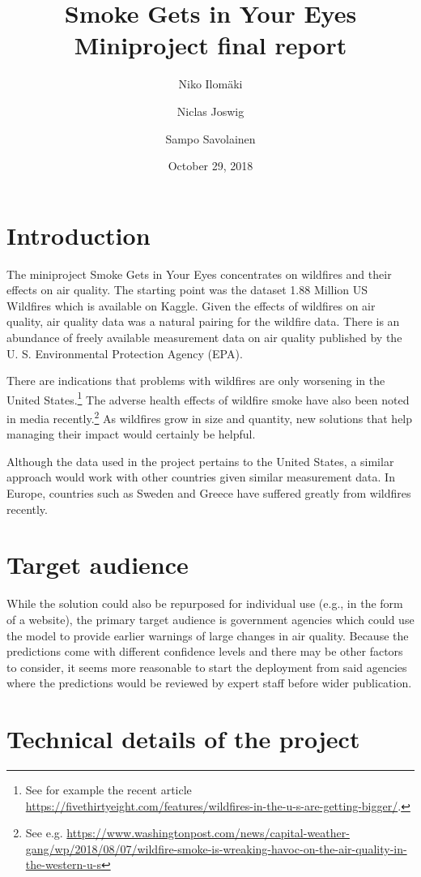 \documentclass[a4paper,12pt]{article}
\title{\vspace*{-3cm}Smoke Gets in Your Eyes\\\Large{Miniproject final report}}
\author{Niko Ilomäki \and Niclas Joswig \and Sampo Savolainen}
\date{October 29, 2018}
\begin{document}
\maketitle

\section{Introduction}

The miniproject Smoke Gets in Your Eyes concentrates on wildfires and their effects on air quality. The starting point was the dataset 1.88 Million US Wildfires which is available on Kaggle. Given the effects of wildfires on air quality, air quality data was a natural pairing for the wildfire data. There is an abundance of freely available measurement data on air quality published by the U. S. Environmental Protection Agency (EPA).

There are indications that problems with wildfires are only worsening in the United States.\footnote{See for example the recent article \url{https://fivethirtyeight.com/features/wildfires-in-the-u-s-are-getting-bigger/}.} The adverse health effects of wildfire smoke have also been noted in media recently.\footnote{See e.g. \url{https://www.washingtonpost.com/news/capital-weather-gang/wp/2018/08/07/wildfire-smoke-is-wreaking-havoc-on-the-air-quality-in-the-western-u-s}} As wildfires grow in size and quantity, new solutions that help managing their impact would certainly be helpful.

Although the data used in the project pertains to the United States, a similar approach would work with other countries given similar measurement data. In Europe, countries such as Sweden and Greece have suffered greatly from wildfires recently.

\section{Target audience}

While the solution could also be repurposed for individual use (e.g., in the form of a website), the primary target audience is government agencies which could use the model to provide earlier warnings of large changes in air quality. Because the predictions come with different confidence levels and there may be other factors to consider, it seems more reasonable to start the deployment from said agencies where the predictions would be reviewed by expert staff before wider publication.

\section{Technical details of the project}
\end{document}
